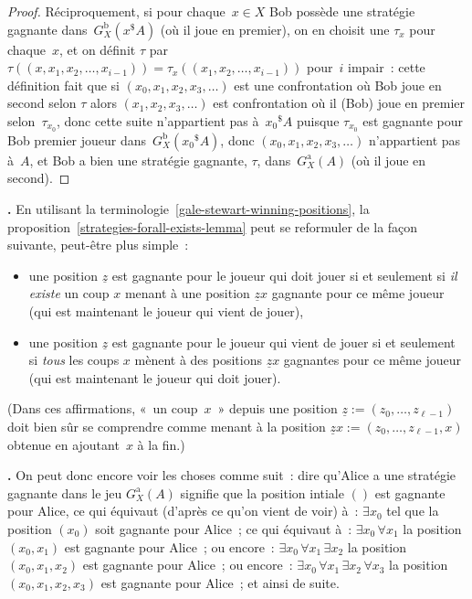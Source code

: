\documentclass[12pt,a4paper]{article}
\theoremstyle{definition}
\newcommand\thingy{%
\refstepcounter{comcnt}\smallskip\noindent\textbf{\thecomcnt.} }
\begin{document}
\begin{proof}
Réciproquement, si pour chaque $x\in X$ Bob possède une stratégie
gagnante dans $G_X^{\mathrm{b}}(x^{\$} A)$ (où il joue en premier), on
en choisit une $\tau_x$ pour chaque $x$, et on définit $\tau$ par
$\tau((x,x_1,x_2,\ldots,x_{i-1})) = \tau_x((x_1,x_2,\ldots,x_{i-1}))$
pour $i$ impair : cette définition fait que si
$(x_0,x_1,x_2,x_3,\ldots)$ est une confrontation où Bob joue en second
selon $\tau$ alors $(x_1,x_2,x_3,\ldots)$ est confrontation où il
(Bob) joue en premier selon $\tau_{x_0}$, donc cette suite
n'appartient pas à ${x_0}^{\$} A$ puisque $\tau_{x_0}$ est gagnante
pour Bob premier joueur dans $G_X^{\mathrm{b}}({x_0}^{\$} A)$, donc
$(x_0,x_1,x_2,x_3,\ldots)$ n'appartient pas à $A$, et Bob a bien une
stratégie gagnante, $\tau$, dans $G_X^{\mathrm{a}}(A)$ (où il joue en
second).
\end{proof}

\thingy\label{strategies-forall-exists-reformulation} En utilisant la
terminologie \ref{gale-stewart-winning-positions}, la
proposition \ref{strategies-forall-exists-lemma} peut se reformuler de
la façon suivante, peut-être plus simple :
\begin{itemize}
\item une position $\underline{z}$ est gagnante pour le joueur qui
  doit jouer si et seulement si \emph{il existe} un coup $x$ menant à
  une position $\underline{z}x$ gagnante pour ce même joueur (qui est
  maintenant le joueur qui vient de jouer),
\item une position $\underline{z}$ est gagnante pour le joueur qui
  vient de jouer si et seulement si \emph{tous} les coups $x$ mènent à
  des positions $\underline{z}x$ gagnantes pour ce même joueur (qui
  est maintenant le joueur qui doit jouer).
\end{itemize}
(Dans ces affirmations, « un coup $x$ » depuis une position
$\underline{z} := (z_0,\ldots,z_{\ell-1})$ doit bien sûr se comprendre
comme menant à la position $\underline{z}x :=
(z_0,\ldots,z_{\ell-1},x)$ obtenue en ajoutant $x$ à la fin.)

\thingy On peut donc encore voir les choses comme suit : dire qu'Alice
a une stratégie gagnante dans le jeu $G_X^{\mathrm{a}}(A)$ signifie
que la position intiale $()$ est gagnante pour Alice, ce qui équivaut
(d'après ce qu'on vient de voir) à : $\exists x_0$ tel que la position
$(x_0)$ soit gagnante pour Alice ; ce qui équivaut à : $\exists x_0\,
\forall x_1$ la position $(x_0,x_1)$ est gagnante pour Alice ; ou
encore : $\exists x_0\, \forall x_1\, \exists x_2$ la position
$(x_0,x_1,x_2)$ est gagnante pour Alice ; ou encore : $\exists x_0\,
\forall x_1\, \exists x_2\, \forall x_3$ la position
$(x_0,x_1,x_2,x_3)$ est gagnante pour Alice ; et ainsi de suite.
\end{document}
